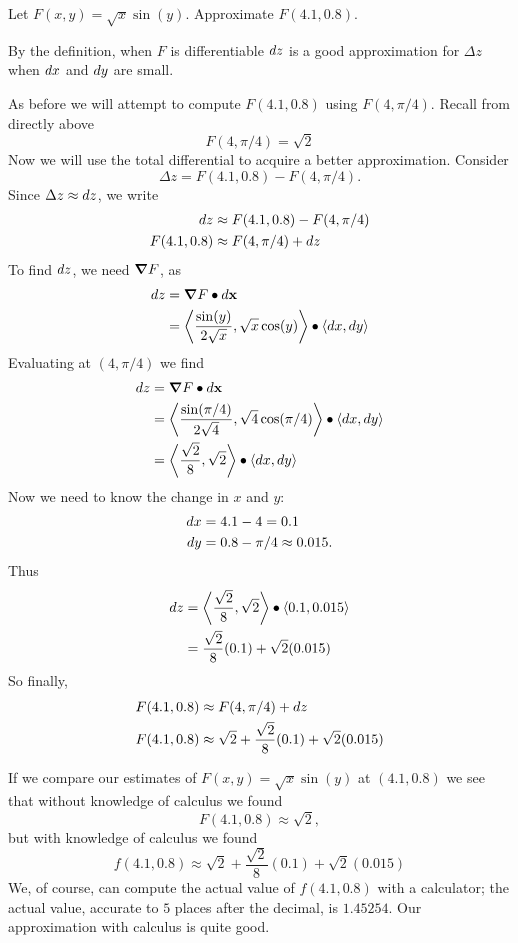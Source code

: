\documentclass{ximera}
\begin{document}
\begin{example}
  Let $F(x,y)=\sqrt{x}\sin(y)$. Approximate $F(4.1,0.8)$.
  \begin{explanation}
    By the definition, when $F$ is differentiable $\mathop{}\!d z$ is a good
    approximation for $\Delta z$ when $\mathop{}\!d x$ and $\mathop{}\!d y$ are small.

    As before we will attempt to compute $F(4.1,0.8)$ using
    $F(4,\pi/4)$. Recall from directly above
    \[
    F(4,\pi/4) = \sqrt{2}
    \]
    Now we will use the total differential to acquire a better
    approximation.  Consider
    \[
    \Delta z = F(4.1,0.8) - F(4,\pi/4).
    \]
    Since $\Delta z\approx \mathop{}\!d z$, we write
    \begin{align*}
      \mathop{}\!d z &\approx F(4.1,0.8) - F(4,\pi/4)\\
      F(4.1,0.8) &\approx F(4,\pi/4)+ \mathop{}\!d z 
    \end{align*}
    To find $\mathop{}\!d z$, we need $\boldsymbol\nabla F$, as
    \begin{align*}
      \mathop{}\!d z &= \boldsymbol\nabla F \bullet \mathop{}\!d\mathbf{x}\\
      &=\left\langle \frac{\sin (y)}{2\sqrt{x}}, \sqrt{x}\cos (y)\right\rangle\bullet\left\langle \mathop{}\!d x,\mathop{}\!d y\right\rangle
    \end{align*}
    Evaluating at $(4,\pi/4)$ we find
    \begin{align*}
      \mathop{}\!d z &= \boldsymbol\nabla F \bullet \mathop{}\!d\mathbf{x}\\
      &=\left\langle \frac{\sin (\pi/4)}{2\sqrt{4}}, \sqrt{4}\cos (\pi/4)\right\rangle\bullet\left\langle \mathop{}\!d x,\mathop{}\!d y \right\rangle\\
      &=\left\langle \frac{\sqrt{2}}{8}, \sqrt{2}\right\rangle\bullet\left\langle \mathop{}\!d x,\mathop{}\!d y \right\rangle
    \end{align*}
    Now we need to know the change in $x$ and $y$:
    \begin{align*}
      \mathop{}\!d x &= 4.1-4= 0.1\\
    \mathop{}\!d y &= 0.8 -\pi/4 \approx 0.015.\\
    \end{align*}
    Thus
    \begin{align*}
      \mathop{}\!d z &=  \left\langle \frac{\sqrt{2}}{8}, \sqrt{2}\right\rangle\bullet\left\langle 0.1,0.015\right\rangle\\ 
      &= \frac{\sqrt{2}}8(0.1) + \sqrt{2}(0.015)\\
    \end{align*}
    So finally,
    \begin{align*}
    F(4.1,0.8) &\approx F(4,\pi/4) + \mathop{}\!d z\\
    F(4.1,0.8) &\approx \sqrt{2} + \frac{\sqrt{2}}8(0.1) + \sqrt{2}(0.015)
    \end{align*}
  \end{explanation}
\end{example}
\begin{remark}
  If we compare our estimates of $F(x,y) = \sqrt{x}\sin(y)$ at
  $(4.1,0.8)$ we see that without knowledge of calculus we found
  \[
  F(4.1,0.8) \approx \sqrt{2},
  \]
  but with knowledge of calculus we found
  \[
  f(4.1,0.8) \approx \sqrt{2} + \frac{\sqrt{2}}8(0.1) + \sqrt{2}(0.015)
  \]
  We, of course, can compute the actual value of $f(4.1,0.8)$ with a
  calculator; the actual value, accurate to $5$ places after the
  decimal, is $1.45254$. Our approximation with calculus is quite
  good.
\end{remark}
\end{document}
